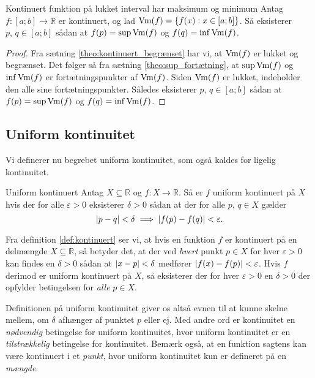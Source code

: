 \begin{theorem}[label=theo:kontinuert_maks]{Kontinuert funktion på lukket interval har maksimum og minimum}{}
  Antag $f:[a;b] \to \mathbb{R}$ er kontinuert, og lad $\operatorname{Vm}(f)=\{ f(x):x \in [a;b] \} $.
  Så eksisterer $p,\,q \in [a;b]$ sådan at $f(p)=\sup \operatorname{Vm}(f)$ og $f(q)=\inf \operatorname{Vm}(f)$.
\end{theorem}
\begin{proof} 
  Fra sætning \ref{theo:kontinuert_begrænset} har vi, at $\operatorname{Vm} (f)$ er lukket og begrænset. 
  Det følger så fra sætning \ref{theo:sup_fortætning}, at $\sup \operatorname{Vm} (f)$ og $\inf \operatorname{Vm} (f)$ er fortætningspunkter af $\operatorname{Vm} (f)$.
  Siden $\operatorname{Vm} (f)$ er lukket, indeholder den alle sine fortætningspunkter. 
  Således eksisterer $p,\,q \in [a;b]$ sådan at $f(p)=\sup \operatorname{Vm}(f)$ og $f(q)=\inf \operatorname{Vm}(f)$.
\end{proof}

\subsection{Uniform kontinuitet}%
  \label{sub:Uniform kontinuitet}

Vi definerer nu begrebet uniform kontinuitet, som også kaldes for ligelig kontinuitet.

\begin{definition}[label=def:uniform_kontinuert]{Uniform kontinuert}{}
  Antag $X \subseteq \mathbb{R}$ og $f:X \to \mathbb{R}$. 
  Så er $f$ uniform kontinuert på $X$ hvis der for alle $\varepsilon >0$ eksisterer $\delta >0$ sådan at der for alle $p,\,q \in X$ gælder
  \[
  \abs{p-q} < \delta \implies \abs{f(p)-f(q)}<\varepsilon.  
  \] 
\end{definition}

Fra definition \ref{def:kontinuert} ser vi, at hvis en funktion $f$ er kontinuert på en delmængde $X \subseteq \mathbb{R}$, så betyder det, at der ved \textit{hvert} punkt $p \in X$ for hver $\varepsilon >0$ kan findes en $\delta >0$ sådan at $\abs{x-p} <\delta $ medfører $\abs{f(x)-f(p)} < \varepsilon  $.
Hvis $f$ derimod er uniform kontinuert på $X$, så eksisterer der for hver $\varepsilon >0$ en $\delta >0$ der opfylder betingelsen for \textit{alle} $p \in X$. 

Definitionen på uniform kontinuitet giver os altså evnen til at kunne skelne mellem, om $\delta $ afhænger af punktet $p$ eller ej. 
Med andre ord er kontinuitet en \textit{nødvendig} betingelse for uniform kontinuitet, hvor uniform kontinuitet er en \textit{tilstrækkelig} betingelse for kontinuitet.
Bemærk også, at en funktion sagtens kan være kontinuert i et \textit{punkt}, hvor uniform kontinuitet kun er defineret på en \textit{mængde}.


